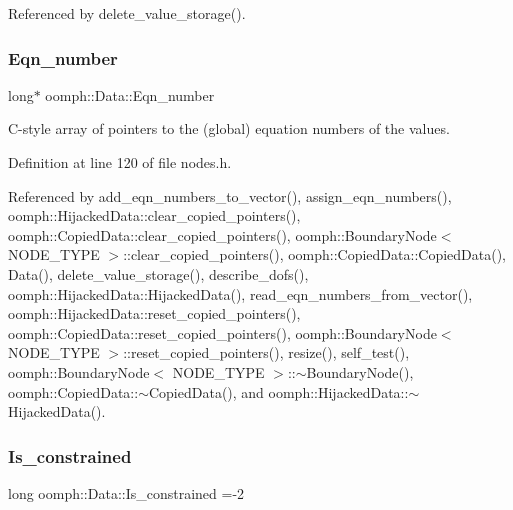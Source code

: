 Referenced by delete\+\_\+value\+\_\+storage().

\mbox{\label{classoomph_1_1Data_a1863d191b66fc4b22fa282ef357c0513}} 
\subsubsection{\texorpdfstring{Eqn\+\_\+number}{Eqn\_number}}
{\footnotesize\ttfamily long$\ast$ oomph\+::\+Data\+::\+Eqn\+\_\+number\hspace{0.3cm}{\ttfamily [private]}}



C-\/style array of pointers to the (global) equation numbers of the values. 



Definition at line 120 of file nodes.\+h.



Referenced by add\+\_\+eqn\+\_\+numbers\+\_\+to\+\_\+vector(), assign\+\_\+eqn\+\_\+numbers(), oomph\+::\+Hijacked\+Data\+::clear\+\_\+copied\+\_\+pointers(), oomph\+::\+Copied\+Data\+::clear\+\_\+copied\+\_\+pointers(), oomph\+::\+Boundary\+Node$<$ N\+O\+D\+E\+\_\+\+T\+Y\+P\+E $>$\+::clear\+\_\+copied\+\_\+pointers(), oomph\+::\+Copied\+Data\+::\+Copied\+Data(), Data(), delete\+\_\+value\+\_\+storage(), describe\+\_\+dofs(), oomph\+::\+Hijacked\+Data\+::\+Hijacked\+Data(), read\+\_\+eqn\+\_\+numbers\+\_\+from\+\_\+vector(), oomph\+::\+Hijacked\+Data\+::reset\+\_\+copied\+\_\+pointers(), oomph\+::\+Copied\+Data\+::reset\+\_\+copied\+\_\+pointers(), oomph\+::\+Boundary\+Node$<$ N\+O\+D\+E\+\_\+\+T\+Y\+P\+E $>$\+::reset\+\_\+copied\+\_\+pointers(), resize(), self\+\_\+test(), oomph\+::\+Boundary\+Node$<$ N\+O\+D\+E\+\_\+\+T\+Y\+P\+E $>$\+::$\sim$\+Boundary\+Node(), oomph\+::\+Copied\+Data\+::$\sim$\+Copied\+Data(), and oomph\+::\+Hijacked\+Data\+::$\sim$\+Hijacked\+Data().

\mbox{\label{classoomph_1_1Data_a71225ddbb54744f6fe662af5a5520ab8}} 
\subsubsection{\texorpdfstring{Is\+\_\+constrained}{Is\_constrained}}
{\footnotesize\ttfamily long oomph\+::\+Data\+::\+Is\+\_\+constrained =-\/2\hspace{0.3cm}{\ttfamily [static]}}



